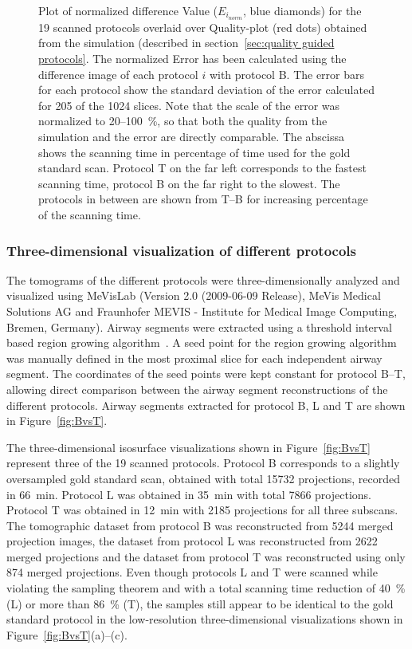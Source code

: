 \begin{figure}
	\centering
	\caption{Plot of normalized difference Value ($E_{i_{norm}}$, blue diamonds) for the 19 scanned protocols overlaid over Quality-plot (red dots) obtained from the simulation (described in section~\ref{sec:quality guided protocols}. The normalized Error has been calculated using the difference image of each protocol $i$ with protocol B. The error bars for each protocol show the standard deviation of the error calculated for 205 of the 1024 slices. Note that the scale of the error was normalized to 20--\SI{100}{\percent}, so that both the quality from the simulation and the error are directly comparable. The abscissa shows the scanning time in percentage of time used for the gold standard scan. Protocol T on the far left corresponds to the fastest scanning time, protocol B on the far right to the slowest. The protocols in between are shown from T--B for increasing percentage of the scanning time.}
	\ifiucr		
		
	\else
	\fi
	\label{fig:NormalizedErrorPlot}
\end{figure}

\subsubsection{Three-dimensional visualization of different protocols}
\label{subsec:comparison}
The tomograms of the different protocols were three-dimensionally analyzed and visualized using MeVisLab (Version 2.0 (2009-06-09 Release), MeVis Medical Solutions AG and Fraunhofer MEVIS - Institute for Medical Image Computing, Bremen, Germany). Airway segments were extracted using a threshold interval based region growing algorithm~\cite{Zucker1976}. A seed point for the region growing algorithm was manually defined in the most proximal slice for each independent airway segment. The coordinates of the seed points were kept constant for protocol B--T, allowing direct comparison between the airway segment reconstructions of the different protocols. Airway segments extracted for protocol B, L and T are shown in Figure~\ref{fig:BvsT}.

The three-dimensional isosurface visualizations shown in Figure~\ref{fig:BvsT} represent three of the 19 scanned protocols. Protocol B corresponds to a slightly oversampled gold standard scan, obtained with total 15732 projections, recorded in \SI{66}{\minute}. Protocol L was obtained in \SI{35}{\minute} with total 7866 projections. Protocol T was obtained in \SI{12}{\minute} with 2185 projections for all three subscans. The tomographic dataset from protocol B was reconstructed from 5244 merged projection images, the dataset from protocol L was reconstructed from 2622 merged projections and the dataset from protocol T was reconstructed using only 874 merged projections. Even though protocols L and T were scanned while violating the sampling theorem and with a total scanning time reduction of \SI{40}{\percent} (L) or more than \SI{86}{\percent} (T), the samples still appear to be identical to the gold standard protocol in the low-resolution three-dimensional visualizations shown in Figure~\ref{fig:BvsT}(a)--(c).

